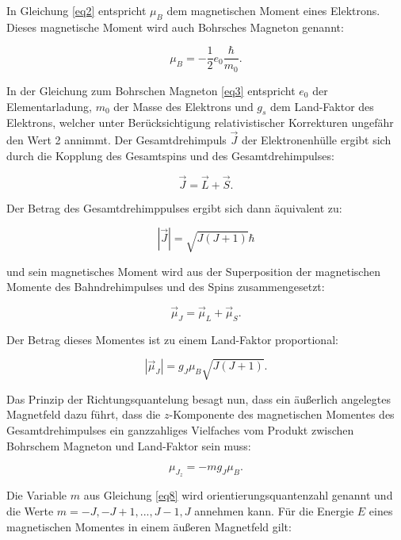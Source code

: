 In Gleichung \ref{eq2} entspricht $\mu_B$ dem magnetischen Moment eines Elektrons. 
Dieses magnetische Moment wird auch Bohrsches Magneton genannt:

\begin{equation}
    \mu_B = - \frac{1}{2}e_0\frac{\hbar}{m_0}.
    \label{eq3}
\end{equation}

In der Gleichung zum Bohrschen Magneton \ref{eq3} entspricht $e_0$ der 
Elementarladung, $m_0$ der Masse des Elektrons und $g_s$ dem Land-Faktor
des Elektrons, welcher unter Berücksichtigung relativistischer Korrekturen 
ungefähr den Wert 2 annimmt.
Der Gesamtdrehimpuls $\vec{J}$ der Elektronenhülle ergibt sich durch die 
Kopplung des Gesamtspins und des Gesamtdrehimpulses:

\begin{equation}
    \vec{J} = \vec{L} + \vec{S}.
    \label{eq4}
\end{equation}

Der Betrag des Gesamtdrehimppulses ergibt sich dann äquivalent zu:

\begin{equation}
    |\vec{J}| = \sqrt{J(J+1)}\hbar
    \label{eq5}
\end{equation}

und sein magnetisches Moment wird aus der Superposition der magnetischen Momente des
Bahndrehimpulses und des Spins zusammengesetzt:

\begin{equation}
    \vec{\mu}_J = \vec{\mu}_L + \vec{\mu}_S.
    \label{eq6}
\end{equation}

Der Betrag dieses Momentes ist zu einem Land-Faktor proportional:

\begin{equation}
    |\vec{\mu}_J| = g_J \mu_B\sqrt{J(J+1)}.
    \label{eq7}
\end{equation}

Das Prinzip der Richtungsquantelung besagt nun, dass ein äußerlich angelegtes 
Magnetfeld dazu führt, dass die $z$-Komponente des magnetischen Momentes des 
Gesamtdrehimpulses ein ganzzahliges Vielfaches vom Produkt zwischen 
Bohrschem Magneton und Land-Faktor sein muss:

\begin{equation}
    \mu_{J_z} = -m g_J \mu_B.
    \label{eq8}
\end{equation}

Die Variable $m$ aus Gleichung \ref{eq8} wird orientierungsquantenzahl genannt und 
die Werte $m = -J, -J+1, ... , J-1,J$ annehmen kann. Für die Energie $E$ eines 
magnetischen Momentes in einem äußeren Magnetfeld gilt:

